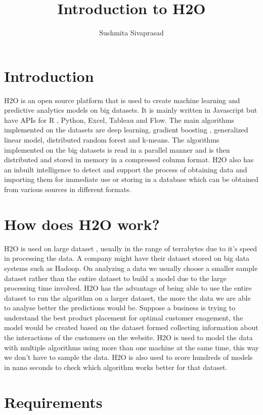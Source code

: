 \documentclass[9pt,twocolumn,twoside]{../../styles/osajnl}
\title{Introduction to H2O}
\author[1]{Sushmita Sivaprasad}
\affil[1]{School of Informatics and Computing, Bloomington, IN 47408, U.S.A.}
\affil[*]{ sushsiva@umail.iu.edu}
\begin{document}
\maketitle

\section{Introduction}

H2O is an open source platform that is used to create machine learning
and predictive analytics models on big datasets. It is mainly written
in Javascript but have APIs for R , Python, Excel, Tableau and
Flow\cite{www-h2o-webpage}. The main algorithms implemented on the
datasets are deep learning, gradient boosting , generalized linear
model, distributed random forest and k-means. The algorithms
implemented on the big datasets is read in a parallel manner and is
then distributed and stored in memory in a compressed column
format. H2O also has an inbuilt intelligence to detect and support the
process of obtaining data and importing them for immediate use or
storing in a database which can be obtained from various sources in
different formats\cite{www-h2o-webpage}.

\section{How does H2O work?}

H2O is used on large dataset , usually in the range of terrabytes due
to it's speed in processing the data. A company might have their
dataset stored on big data systems such as Hadoop. On analyzing a data
we usually choose a smaller sample dataset rather than the entire
dataset to build a model due to the large processing time
involved. H2O has the advantage of being able to use the entire
dataset to run the algorithm on a larger dataset, the more the data we
are able to analyse better the predictions would
be\cite{www-h2oyoutubevideo}. Suppose a business is trying to
understand the best product placement for optimal customer enagement,
the model would be created based on the dataset formed collecting
information about the interactions of the customers on the
website. H2O is used to model the data with multiple algorithms using
more than one machine at the same time, this way we don’t have to
sample the data\cite{www-h2oyoutubevideo}. H2O is also used to score
hundreds of models in nano seconds to check which algorithm works
better for that dataset.

\section{Requirements}
\end{document}
